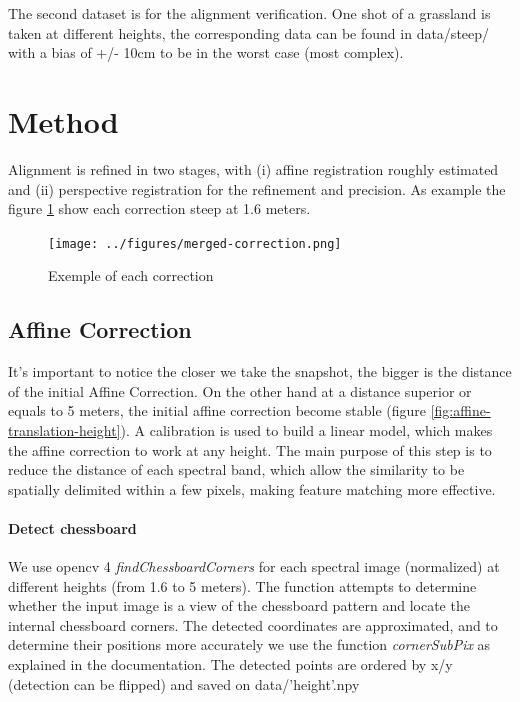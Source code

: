 \documentclass[]{elsarticle}
\begin{document}
	The second dataset is for the alignment verification. One shot of a grassland is taken at different heights, the corresponding data can be found in data/steep/
	with a bias of +/- 10cm to be in the worst case (most complex).
	
	\newpage
	\section{Method}
	
	Alignment is refined in two stages, with
	(i) affine registration roughly estimated
	and (ii) perspective registration for the refinement and precision.
	As example the figure \ref{fig:merged-correction} show each correction steep at 1.6 meters.
	
	\begin{figure}[!htb]
		\centering
		\texttt{[image: ../figures/merged-correction.png]}
		\caption{Exemple of each correction}
		\label{fig:merged-correction}
	\end{figure}
	
	\subsection{Affine Correction}
	
	It's important to notice the closer we take the snapshot, the bigger is the distance of the initial Affine Correction.
	On the other hand at a distance superior or equals to 5 meters, the initial affine correction become stable (figure \ref{fig:affine-translation-height}).
	A calibration is used to build a linear model, which makes the affine correction to work at any height.
	The main purpose of this step is to reduce the distance of each spectral band,
	which allow the similarity to be spatially delimited within a few pixels, making feature matching more effective.
	
	\paragraph{Detect chessboard}
	We use opencv 4 \textit{findChessboardCorners} for each spectral image (normalized) at different heights (from 1.6 to 5 meters).
	The function attempts to determine whether the input image is a view of the chessboard pattern and locate the internal chessboard corners.
	The detected coordinates are approximated, and to determine their positions more accurately we use the function \textit{cornerSubPix} as explained in the documentation.
	The detected points are ordered by x/y (detection can be flipped) and saved on data/'height'.npy
	
\end{document}
